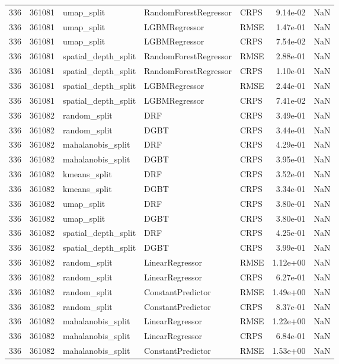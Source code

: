 \begin{tabular}{rrlllrr}
336 & 361081 & umap\_split & RandomForestRegressor & CRPS & 9.14e-02 & NaN \\
336 & 361081 & umap\_split & LGBMRegressor & RMSE & 1.47e-01 & NaN \\
336 & 361081 & umap\_split & LGBMRegressor & CRPS & 7.54e-02 & NaN \\
336 & 361081 & spatial\_depth\_split & RandomForestRegressor & RMSE & 2.88e-01 & NaN \\
336 & 361081 & spatial\_depth\_split & RandomForestRegressor & CRPS & 1.10e-01 & NaN \\
336 & 361081 & spatial\_depth\_split & LGBMRegressor & RMSE & 2.44e-01 & NaN \\
336 & 361081 & spatial\_depth\_split & LGBMRegressor & CRPS & 7.41e-02 & NaN \\
336 & 361082 & random\_split & DRF & CRPS & 3.49e-01 & NaN \\
336 & 361082 & random\_split & DGBT & CRPS & 3.44e-01 & NaN \\
336 & 361082 & mahalanobis\_split & DRF & CRPS & 4.29e-01 & NaN \\
336 & 361082 & mahalanobis\_split & DGBT & CRPS & 3.95e-01 & NaN \\
336 & 361082 & kmeans\_split & DRF & CRPS & 3.52e-01 & NaN \\
336 & 361082 & kmeans\_split & DGBT & CRPS & 3.34e-01 & NaN \\
336 & 361082 & umap\_split & DRF & CRPS & 3.80e-01 & NaN \\
336 & 361082 & umap\_split & DGBT & CRPS & 3.80e-01 & NaN \\
336 & 361082 & spatial\_depth\_split & DRF & CRPS & 4.25e-01 & NaN \\
336 & 361082 & spatial\_depth\_split & DGBT & CRPS & 3.99e-01 & NaN \\
336 & 361082 & random\_split & LinearRegressor & RMSE & 1.12e+00 & NaN \\
336 & 361082 & random\_split & LinearRegressor & CRPS & 6.27e-01 & NaN \\
336 & 361082 & random\_split & ConstantPredictor & RMSE & 1.49e+00 & NaN \\
336 & 361082 & random\_split & ConstantPredictor & CRPS & 8.37e-01 & NaN \\
336 & 361082 & mahalanobis\_split & LinearRegressor & RMSE & 1.22e+00 & NaN \\
336 & 361082 & mahalanobis\_split & LinearRegressor & CRPS & 6.84e-01 & NaN \\
336 & 361082 & mahalanobis\_split & ConstantPredictor & RMSE & 1.53e+00 & NaN \\

\end{tabular}
